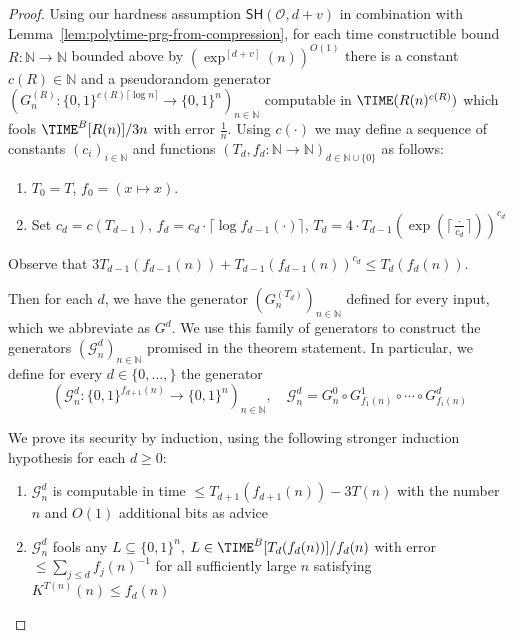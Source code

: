 \documentclass[11pt]{article}
\newcommand{\B}{\{0,1\}}
\newcommand{\SH}{\mathsf{SH}}
\begin{document}
\begin{proof}
Using our hardness assumption $\SH(\mathcal{O},d+v)$ in combination with Lemma~\ref{lem:polytime-prg-from-compression}, for each time constructible bound $R: \mathbb{N} \to \mathbb{N}$ bounded above by $(\exp^{[d+v]}(n))^{O(1)}$ there is a constant $c(R) \in \mathbb{N}$ and a pseudorandom generator $(G^{(R)}_n: \B^{c(R) \lceil \log n \rceil } \to \B^n)_{n \in \mathbb{N}}$ computable in $\TIME(R(n)^{c(R)})$ which fools $\TIME^B[R(n)]/3n$ with error $\frac{1}{n}$. Using $c(\cdot)$ we may define a sequence of constants $(c_i)_{i \in \mathbb{N}}$ and functions $(T_d,f_d: \mathbb{N} \to \mathbb{N})_{d \in\mathbb{N} \cup \{0\}}$ as follows:


\begin{enumerate}
    \item $T_0 = T$, $f_0 = (x \mapsto x)$.
    \item Set $c_d = c(T_{d-1})$, $f_d = c_d \cdot \lceil \log f_{d-1}(\cdot) \rceil $, $T_d = 4 \cdot T_{d-1}(\exp(\lceil \frac{\cdot }{c_d} \rceil ))^{c_d}$
\end{enumerate}
Observe that $3T_{d-1}(f_{d-1}(n)) + T_{d-1}(f_{d-1}(n))^{c_d} \leq T_d(f_d(n))$.

Then for each $d$, we have the generator $(G_n^{(T_d)})_{n \in \mathbb{N}}$ defined for every input, which we abbreviate as $G^d$. We use this family of generators to construct the generators $(\mathcal{G}^d_n)_{n \in \mathbb{N}}$ promised in the theorem statement. 
In particular, we define for every $d \in \{0,\ldots, \}$ the generator
\[
(\mathcal{G}^d_n: \B^{f_{d+1}(n)} \to \B^{n})_{n \in \mathbb{N}}, \quad  \mathcal{G}^d_n = G_n^0 \circ G^1_{f_1(n)} \circ \cdots \circ G^d_{f_i(n)}
\]

We prove its security by induction, using the following stronger induction hypothesis for each $d \geq 0$: 

\begin{enumerate}
    \item $\mathcal{G}^{d}_n$ is computable in time $\leq T_{d+1}(f_{d+1}(n))- 3T(n)$ with the number $n$ and $ O(1)$ additional bits as advice
    \item $\mathcal{G}^d_n$ fools any $L \subseteq \B^n$, $L \in \TIME^B[T_{d}(f_d(n))]/f_d(n)$ with error $\leq \sum_{j \leq d} f_j(n)^{-1}$ for all sufficiently large $n$ satisfying $ K^{T(n)}(n) \leq f_d(n)$
\end{enumerate}



\end{proof}
\end{document}
